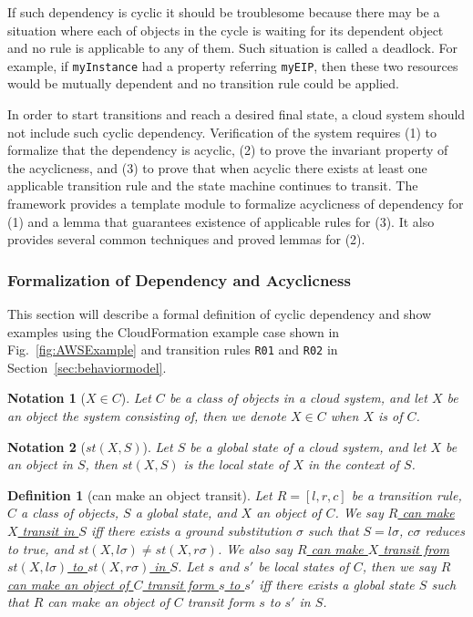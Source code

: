 \documentclass[12pt]{report}
\newtheorem{notation}{Notation}
\newtheorem{definition}{Definition}
\newcommand{\ul}{\underline}
\begin{document}
If such dependency is cyclic it should be troublesome because there
may be a situation where each of objects in the cycle is waiting for
its dependent object and no rule is applicable to any of them. Such
situation is called a deadlock.  For example, if {\tt myInstance} had
a property referring {\tt myEIP}, then these two resources would be
mutually dependent and no transition rule could be applied.

In order to start transitions and reach a desired final state, a cloud
system should not include such cyclic dependency. Verification of the
system requires (1) to formalize that the dependency is acyclic, (2)
to prove the invariant property of the acyclicness, and (3) to prove
that when acyclic there exists at least one applicable transition rule
and the state machine continues to transit. The framework provides a
template module to formalize acyclicness of dependency for (1) and a
lemma that guarantees existence of applicable rules for (3). It also
provides several common techniques and proved lemmas for (2).

\subsubsection{Formalization of Dependency and Acyclicness}
This section will describe a formal definition of cyclic dependency
and show examples using the CloudFormation example case shown in
Fig.~\ref{fig:AWSExample} and transition rules {\tt R01} and {\tt R02}
in Section~\ref{sec:behaviormodel}.

\begin{notation}[$X \in C$]
Let $C$ be a class of objects in a cloud system, and let $X$ be an object
the system consisting of, then we denote \ul{$X \in C$} when $X$ is of
$C$.
\end{notation}

\begin{notation}[$st(X,S)$]
Let $S$ be a global state of a cloud system, and let $X$ be an object in
$S$\!, then \ul{$st(X,S)$} is the local state of $X$ in the context of
$S$\!.
\end{notation}

\begin{definition}[can make an object transit]
Let $R = [l,r,c]$ be a transition rule, $C$ a class of objects, $S$
a global state, and $X$ an object of $C$. We say \ul{$R$ can
  make $X$ transit in $S$} iff there exists a ground substitution
$\sigma$ such that $S = l\sigma$, $c\sigma$ reduces to true, and
$st(X,l\sigma) \ne st(X,r\sigma)$. We also say \ul{$R$ can make $X$
  transit from $st(X,l\sigma)$ to $st(X,r\sigma)$ in $S$}\!.  Let $s$
and $s'$ be local states of $C$, then we say \ul{$R$ can make an object
  of $C$ transit form $s$ to $s'$} iff there exists a global state $S$
such that $R$ can make an object of $C$ transit form $s$ to $s'$ in $S$\!.
\end{definition}
\end{document}
